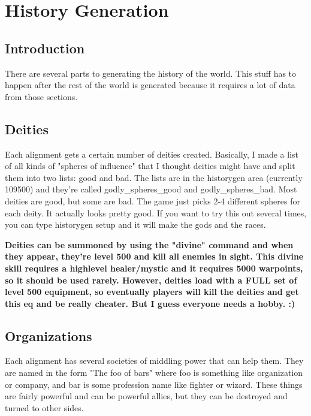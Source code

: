 \chapter{History Generation}

\section{Introduction}

There are several parts to generating the history of the world. This stuff has
to happen after the rest of the world is generated because it requires a lot
of data from those sections.

\section{Deities}

Each alignment gets a certain number of deities created. Basically, I made a
list of all kinds of "spheres of influence" that I thought deities might have
and split them into two lists: good and bad. The lists are in the historygen
area (currently 109500) and they're called godly\_spheres\_good and
godly\_spheres\_bad. Most deities are good, but some are bad. The game just
picks 2-4 different spheres for each deity. It actually looks pretty good. If
you want to try this out several times, you can type historygen setup and it
will make the gods and the races.

{\bf{Deities can be summoned by using the "divine" command and when they
    appear, they're level 500 and kill all enemies in sight. This divine skill
    requires a highlevel healer/mystic and it requires 5000 warpoints, so it
    should be used rarely. However, deities load with a FULL set of level 500
    equipment, so eventually players will kill the deities and get this eq and
    be really cheater. But I guess everyone needs a hobby. :)}}

\section{Organizations}

Each alignment has several societies of middling power that can help
them. They are named in the form "The foo of bars" where foo is something like
organization or company, and bar is some profession name like fighter or wizard.
These things are fairly powerful and can be powerful allies, but they can be
destroyed and turned to other sides.

